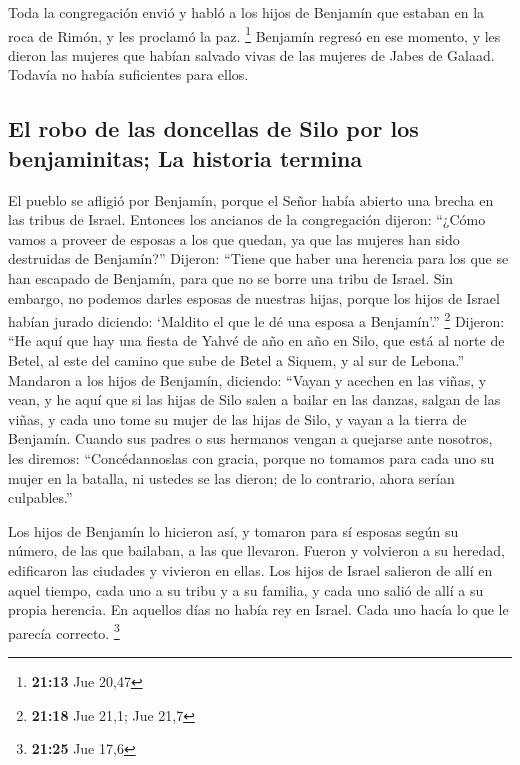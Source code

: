  Toda la congregación envió y habló a los hijos de
Benjamín que estaban en la roca de Rimón, y les proclamó la paz.
\footnote{\textbf{21:13} Jue 20,47}  Benjamín regresó en
ese momento, y les dieron las mujeres que habían salvado vivas de las
mujeres de Jabes de Galaad. Todavía no había suficientes para ellos.

\hypertarget{el-robo-de-las-doncellas-de-silo-por-los-benjaminitas-la-historia-termina}{%
\subsection{El robo de las doncellas de Silo por los benjaminitas; La
historia
termina}\label{el-robo-de-las-doncellas-de-silo-por-los-benjaminitas-la-historia-termina}}

 El pueblo se afligió por Benjamín, porque el Señor había
abierto una brecha en las tribus de Israel.  Entonces los
ancianos de la congregación dijeron: ``¿Cómo vamos a proveer de esposas
a los que quedan, ya que las mujeres han sido destruidas de Benjamín?''
 Dijeron: ``Tiene que haber una herencia para los que se
han escapado de Benjamín, para que no se borre una tribu de Israel.
 Sin embargo, no podemos darles esposas de nuestras
hijas, porque los hijos de Israel habían jurado diciendo: `Maldito el
que le dé una esposa a Benjamín'.'' \footnote{\textbf{21:18} Jue 21,1;
  Jue 21,7}  Dijeron: ``He aquí que hay una fiesta de
Yahvé de año en año en Silo, que está al norte de Betel, al este del
camino que sube de Betel a Siquem, y al sur de Lebona.'' 
Mandaron a los hijos de Benjamín, diciendo: ``Vayan y acechen en las
viñas,  y vean, y he aquí que si las hijas de Silo salen
a bailar en las danzas, salgan de las viñas, y cada uno tome su mujer de
las hijas de Silo, y vayan a la tierra de Benjamín. 
Cuando sus padres o sus hermanos vengan a quejarse ante nosotros, les
diremos: ``Concédannoslas con gracia, porque no tomamos para cada uno su
mujer en la batalla, ni ustedes se las dieron; de lo contrario, ahora
serían culpables.''

 Los hijos de Benjamín lo hicieron así, y tomaron para sí
esposas según su número, de las que bailaban, a las que llevaron. Fueron
y volvieron a su heredad, edificaron las ciudades y vivieron en ellas.
 Los hijos de Israel salieron de allí en aquel tiempo,
cada uno a su tribu y a su familia, y cada uno salió de allí a su propia
herencia.  En aquellos días no había rey en Israel. Cada
uno hacía lo que le parecía correcto. \footnote{\textbf{21:25} Jue 17,6}
